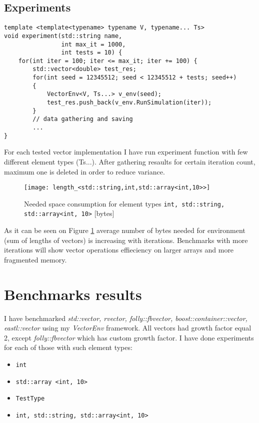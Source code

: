 \documentclass[inz, english, shortabstract]{iithesis}
\begin{document}
\section {Experiments}
\begin{lstlisting}[caption=experiment function]
template <template<typename> typename V, typename... Ts>
void experiment(std::string name, 
				int max_it = 1000, 
				int tests = 10) {
	for(int iter = 100; iter <= max_it; iter += 100) {
		std::vector<double> test_res;
		for(int seed = 12345512; seed < 12345512 + tests; seed++) 
		{
			VectorEnv<V, Ts...> v_env(seed);
			test_res.push_back(v_env.RunSimulation(iter));
		}
		// data gathering and saving
		...
}
\end{lstlisting}
For each tested vector implementation I have run experiment function with few different element types (Ts...). After gathering resaults for certain iteration count, maximum one is deleted in order to reduce variance.


\begin{figure}[h!]
\caption{Needed space consumption for element types \lstinline{int, std::string, std::array<int, 10>} [bytes]}
\label{space_consumption}
\texttt{[image: length\_<std::string,int,std::array<int,10>>]}
\end{figure}

As it can be seen on Figure \ref{space_consumption} average number of bytes needed for environment (sum of lengths of vectors) is increasing with iterations. Benchmarks with more iterations will show vector operations effieciency on larger arrays and more fragmented memory.

\chapter{Benchmarks results}

I have benchmarked {\it std::vector, rvector, folly::fbvector, boost::container::vector, eastl::vector} using my {\it VectorEnv} framework. All vectors had growth factor equal 2, except {\it folly::fbvector} which has custom growth factor. I have done experiments for each of those with such element types:
\begin{itemize}
\item \lstinline{int}
\item \lstinline{std::array <int, 10>}
\item \lstinline{TestType}
\item \lstinline{int, std::string, std::array<int, 10>}
\end{itemize}
\end{document}
